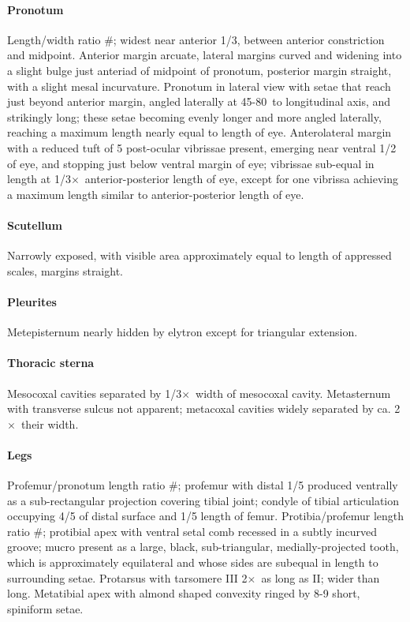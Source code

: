 \documentclass[fleqn,10pt,lineno]{wlpeerj} %
\newcommand{\td}{\textdegree~}
\newcommand{\x}{$\times$~}
\begin{document}
			\paragraph{Pronotum}
				Length/width ratio \#; widest near anterior 1/3, between anterior constriction and midpoint. 
				Anterior margin arcuate, lateral margins curved and widening into a slight bulge just anteriad of midpoint of pronotum, posterior margin straight, with a slight mesal incurvature. 
				Pronotum in lateral view with setae that reach just beyond anterior margin, angled laterally at 45-80\td to longitudinal axis, and strikingly long; these setae becoming evenly longer and more angled laterally, reaching a maximum length nearly equal to length of eye. 
				Anterolateral margin with a reduced tuft of 5 post-ocular vibrissae present, emerging near ventral 1/2 of eye, and stopping just below ventral margin of eye; vibrissae sub-equal in length at 1/3\x anterior-posterior length of eye, except for one vibrissa achieving a maximum length similar to anterior-posterior length of eye.
			\paragraph{Scutellum}
				Narrowly exposed, with visible area approximately equal to length of appressed scales, margins straight.
			\paragraph{Pleurites}
				Metepisternum nearly hidden by elytron except for triangular extension.
			\paragraph{Thoracic sterna} 
				Mesocoxal cavities separated by 1/3\x width of mesocoxal cavity. 
				Metasternum with transverse sulcus not apparent; metacoxal cavities widely separated by ca. 2\x their width.
			\paragraph{Legs}
				Profemur/pronotum length ratio \#; profemur with distal 1/5 produced ventrally as a sub-rectangular projection covering tibial joint; condyle of tibial articulation occupying 4/5 of distal surface and 1/5 length of femur. 
				Protibia/profemur length ratio \#; protibial apex with ventral setal comb recessed in a subtly incurved groove; mucro present as a large, black, sub-triangular, medially-projected tooth, which is approximately equilateral and whose sides are subequal in length to surrounding setae. 
				Protarsus with tarsomere III 2\x as long as II; wider than long. 
				Metatibial apex with almond shaped convexity ringed by 8-9 short, spiniform setae.
\end{document}

